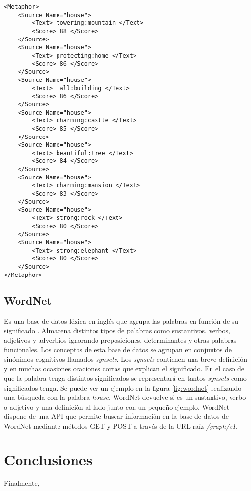 \lstset{language=XML}
\begin{lstlisting}[caption= Ejemplo formatos XML Metaphor Magnet, label={lst:xmlmetaphormagnet}, frame=single]
<Metaphor>
	<Source Name="house">
		<Text> towering:mountain </Text>
		<Score> 88 </Score>
	</Source>
	<Source Name="house">
		<Text> protecting:home </Text>
		<Score> 86 </Score>
	</Source>
	<Source Name="house">
		<Text> tall:building </Text>
		<Score> 86 </Score>
	</Source>
	<Source Name="house">
		<Text> charming:castle </Text>
		<Score> 85 </Score>
	</Source>
	<Source Name="house">
		<Text> beautiful:tree </Text>
		<Score> 84 </Score>
	</Source>
	<Source Name="house">
		<Text> charming:mansion </Text>
		<Score> 83 </Score>
	</Source>
	<Source Name="house">
		<Text> strong:rock </Text>
		<Score> 80 </Score>
	</Source>
	<Source Name="house">
		<Text> strong:elephant </Text>
		<Score> 80 </Score>
	</Source>
</Metaphor>
\end{lstlisting}




\subsection{WordNet}
\label{cap:subsec:wordnet}
Es una base de datos léxica en inglés que agrupa las palabras en función de su significado \citep{wordnet2010}. Almacena distintos tipos de palabras  como sustantivos, verbos, adjetivos y adverbios ignorando preposiciones, determinantes y otras palabras funcionales. Los conceptos de esta base de datos se agrupan en conjuntos de sinónimos cognitivos llamados \textit{synsets}. Los \textit{synsets} contienen una breve definición y en muchas ocasiones oraciones cortas que explican el significado. En el caso de que la palabra tenga distintos significados se representará en tantos \textit{synsets} como significados tenga. Se puede ver un ejemplo en la figura \ref{fig:wordnet} realizando una búsqueda con la palabra \textit{house}. WordNet devuelve si es un sustantivo, verbo o adjetivo y una definición al lado junto con un pequeño ejemplo.
WordNet dispone de una API que permite buscar información en la base de datos de WordNet mediante métodos GET y POST a través de la URL raíz \textit{/graph/v1}.



\section{Conclusiones}
Finalmente, 

